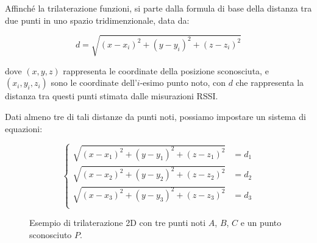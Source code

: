 \noindent Affinché la trilaterazione funzioni, si parte dalla formula di base della distanza tra due punti in uno spazio tridimenzionale, data da:

\begin{equation}
    d = \sqrt{(x-x_i)^2 + (y-y_i)^2 + (z-z_i)^2}
\end{equation}

\noindent dove $(x,y,z)$ rappresenta le coordinate della posizione sconosciuta, e $(x_i,y_i, z_i)$ sono le coordinate dell'$i$-esimo punto noto, con $d$ che rappresenta la distanza tra questi punti stimata dalle misurazioni RSSI.

\pagebreak

\noindent Dati almeno tre di tali distanze da punti noti, possiamo impostare un sistema di equazioni:

\begin{equation}
    \begin{cases}
        \sqrt{(x-x_1)^2 + (y-y_1)^2 + (z-z_1)^2} &= d_1 \\
        \sqrt{(x-x_2)^2 + (y-y_2)^2 + (z-z_2)^2} &= d_2 \\
        \sqrt{(x-x_3)^2 + (y-y_3)^2 + (z-z_3)^2} &= d_3 \\
    \end{cases}
\end{equation}

\begin{wrapfigure}{r}{0.5\textwidth}
    \centering
    \begin{adjustbox}{max size={\textwidth}{\textheight}}
    \end{adjustbox}
    \caption{Esempio di trilaterazione 2D con tre punti noti $A$, $B$, $C$ e un punto sconosciuto $P$.}
    \label{fig:trilaterazione}
\end{wrapfigure}

